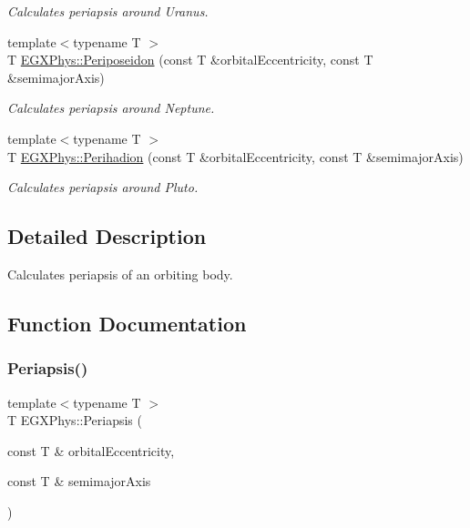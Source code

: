 \begin{DoxyCompactItemize}
\begin{DoxyCompactList}\small\item\em Calculates periapsis around Uranus. \end{DoxyCompactList}\item 
{\footnotesize template$<$typename T $>$ }\\T \mbox{\hyperlink{group___periapsis_ga237e7af3794202c67e65f64f4c8abc2a}{E\+G\+X\+Phys\+::\+Periposeidon}} (const T \&orbital\+Eccentricity, const T \&semimajor\+Axis)
\begin{DoxyCompactList}\small\item\em Calculates periapsis around Neptune. \end{DoxyCompactList}\item 
{\footnotesize template$<$typename T $>$ }\\T \mbox{\hyperlink{group___periapsis_gafb16e46e55078b38604eef0d7c7c40c4}{E\+G\+X\+Phys\+::\+Perihadion}} (const T \&orbital\+Eccentricity, const T \&semimajor\+Axis)
\begin{DoxyCompactList}\small\item\em Calculates periapsis around Pluto. \end{DoxyCompactList}\end{DoxyCompactItemize}


\subsection{Detailed Description}
Calculates periapsis of an orbiting body. 

\subsection{Function Documentation}
\mbox{\label{group___periapsis_ga4414ac75539371ec874a3d25cad6c9fe}} 
\subsubsection{\texorpdfstring{Periapsis()}{Periapsis()}}
{\footnotesize\ttfamily template$<$typename T $>$ \\
T E\+G\+X\+Phys\+::\+Periapsis (\begin{DoxyParamCaption}\item[{const T \&}]{orbital\+Eccentricity,  }\item[{const T \&}]{semimajor\+Axis }\end{DoxyParamCaption})}



